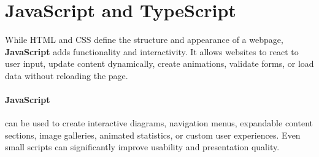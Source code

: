 \section{JavaScript and TypeScript}\label{sec:javascript-and-typescript}
While HTML and CSS define the structure and appearance of a webpage, \textbf{JavaScript} adds functionality and interactivity.
It allows websites to react to user input, update content dynamically, create animations, validate forms, or load data without reloading the page.

\paragraph{JavaScript} can be used to create interactive diagrams, navigation menus, expandable content sections, image galleries,
animated statistics, or custom user experiences.
Even small scripts can significantly improve usability and presentation quality.

